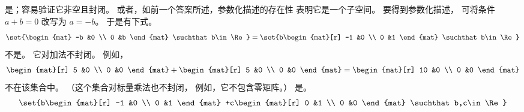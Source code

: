 \begin{exercises}
\begin{answer}
\begin{exparts}
        \partsitem 是；容易验证它非空且封闭。
         或者，如前一个答案所述，参数化描述的存在性
         表明它是一个子空间。
         要得到参数化描述，
         可将条件 $a+b=0$ 改写为 $a=-b$。
         于是有下式。
          \begin{equation*}
            \set{\begin{mat}
                    -b  &0  \\
                    0   &b
                  \end{mat}
                 \suchthat b\in\Re}
            =\set{b\begin{mat}[r]
                    -1  &0  \\
                    0   &1
                  \end{mat}
                 \suchthat b\in\Re}
          \end{equation*}
        \partsitem 不是。
          它对加法不封闭。
          例如，
          \begin{equation*}
            \begin{mat}[r]
              5  &0  \\
              0  &0
            \end{mat}
            +\begin{mat}[r]
              5  &0  \\
              0  &0
            \end{mat}
            =\begin{mat}[r]
              10  &0  \\
              0  &0
            \end{mat}
          \end{equation*}
          不在该集合中。
          （这个集合对标量乘法也不封闭，
          例如，它不包含零矩阵。）
        \partsitem 是。
          \begin{equation*}
            \set{b\begin{mat}[r]
                    -1  &0  \\
                    0   &1
                  \end{mat}
                 +c\begin{mat}[r]
                    0  &1  \\
                    0  &0
                   \end{mat}
                 \suchthat b,c\in\Re}
          \end{equation*}
      \end{exparts}
     \end{answer}

\end{exercises}
